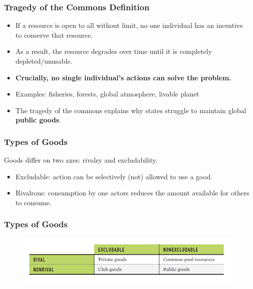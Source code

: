 \documentclass{beamer}
\begin{document}
\begin{frame} 
	\frametitle{\LARGE{Tragedy of the Commons Definition}}
	\begin{itemize}
		\item If a resource is open to all without limit, no one individual has an incentive to conserve that resource. \pause
		
		\item As a result, the resource degrades over time until it is completely depleted/unusable. \pause 
		\item \textbf{Crucially, no single individual's actions can solve the problem.} \pause 
		
		\item Examples: \pause fisheries, forests, global atmosphere, livable planet \pause
		
		\item The tragedy of the commons explains why states struggle to maintain global \textbf{public goods}.
	\end{itemize}
\end{frame}

\begin{frame} 
	\frametitle{\LARGE{Types of Goods}}
	Goods differ on two axes: rivalry and excludability.
	\begin{itemize}
		
		\item Excludable: action can be selectively (not) allowed to use a good. \pause
		
		\item Rivalrous: consumption by one actors reduces the amount available for others to consume. 
	\end{itemize}
\end{frame}

\begin{frame} 
	\frametitle{\LARGE{Types of Goods}}
	\begin{figure}[ht!]
		\centering
		\includegraphics[width=\textwidth,height=0.8\textheight, keepaspectratio]{./goods.png}
	\end{figure}
\end{frame}
\end{document}
